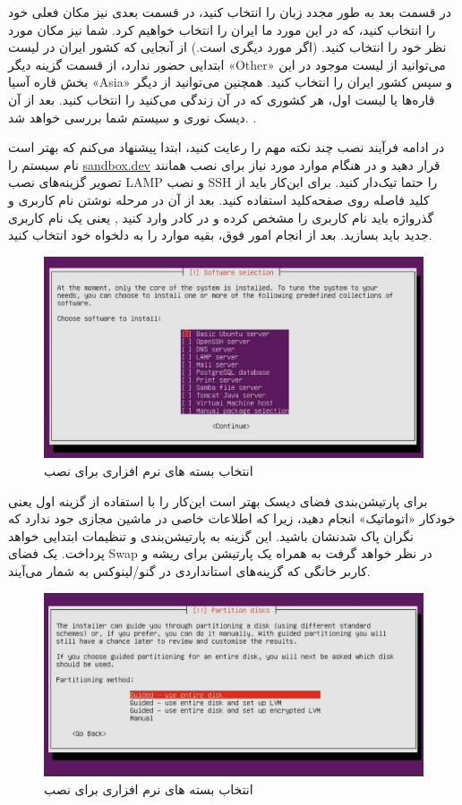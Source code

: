 در قسمت بعد به طور مجدد زبان را انتخاب کنید، در قسمت بعدی نیز مکان فعلی خود را انتخاب کنید، که در این مورد ما ایران را انتخاب خواهیم کرد. شما نیز مکان مورد نظر خود را انتخاب کنید. (اگر مورد دیگری است.) از آنجایی که کشور ایران در لیست ابتدایی حضور ندارد، از قسمت گزینه دیگر «Other»  می‌توانید از لیست موجود در این بخش قاره آسیا «Asia» و سپس کشور ایران را انتخاب کنید.  همچنین می‌توانید از دیگر قاره‌ها یا لیست اول، هر کشوری که در آن زندگی می‌کنید را انتخاب کنید. بعد از آن دیسک نوری و سیستم شما بررسی خواهد شد. .

در ادامه فرآیند نصب چند نکته مهم را رعایت کنید، ابتدا پیشنهاد می‌کنم که بهتر است نام سیستم را 
\url{ sandbox.dev}
 قرار دهید و در هنگام موارد مورد نیاز برای نصب همانند تصویر گزینه‌های نصب  \lr{}LAMP و نصب \lr{}SSH را حتما تیک‌دار کنید. برای این‌کار باید از کلید فاصله روی صفحه‌کلید استفاده کنید. بعد از آن در مرحله نوشتن نام کاربری و گذرواژه  باید نام کاربری را مشخص کرده و در کادر وارد کنید , یعنی یک نام کاربری جدید باید بسازید. بعد از انجام امور فوق، بقیه موارد را به دلخواه خود انتخاب کنید.
\\
\begin{figure}
    \includegraphics[width=.9\textwidth ,height=.45\textwidth]{Pic/UbuntuServer3}
    \caption{ انتخاب بسته های نرم افزاری برای نصب}
    \label{UbuntuServer3}
\end{figure}

برای پارتیشن‌بندی فضای دیسک بهتر است این‌کار را با استفاده از گزینه اول یعنی خودکار «اتوماتیک» انجام دهید، زیرا که اطلاعات خاصی در ماشین مجازی جود ندارد که نگران پاک شدنشان باشید. این گزینه به پارتیشن‌بندی و تنظیمات ابتدایی خواهد پرداخت. یک فضای Swap در نظر خواهد گرفت به همراه یک پارتیشن برای ریشه و کاربر خانگی که گزینه‌های استانداردی در گنو/لینوکس به شمار می‌آیند.
\begin{figure}
    \includegraphics[width=.9\textwidth ,height=.45\textwidth]{Pic/UbuntuServer4}
    \caption{ انتخاب بسته های نرم افزاری برای نصب}
    \label{UbuntuServer4}
\end{figure}


